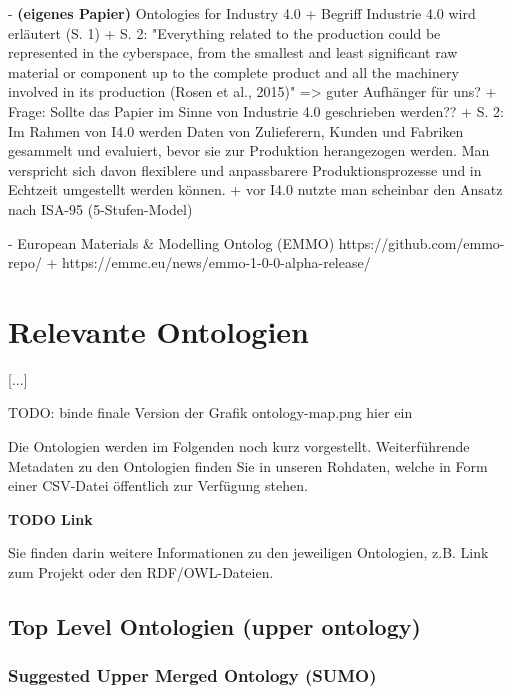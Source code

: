 \documentclass{article}
\begin{document}
- \textbf{(eigenes Papier)} Ontologies for Industry 4.0 \cite{kumar2019ontologies}
  + Begriff Industrie 4.0 wird erläutert (S. 1)
  + S. 2: "Everything related to the production could be represented in the cyberspace, from the smallest and least significant raw material or component up to the complete product and all the machinery
  involved in its production (Rosen et al., 2015)" => guter Aufhänger für uns?
  + Frage: Sollte das Papier im Sinne von Industrie 4.0 geschrieben werden??
  + S. 2: Im Rahmen von I4.0 werden Daten von Zulieferern, Kunden und Fabriken gesammelt und evaluiert, bevor sie zur Produktion herangezogen werden. Man verspricht sich davon flexiblere und anpassbarere Produktionsprozesse und in Echtzeit umgestellt werden können.
  + vor I4.0 nutzte man scheinbar den Ansatz nach ISA-95 (5-Stufen-Model)



- European Materials \& Modelling Ontolog (EMMO) https://github.com/emmo-repo/ + https://emmc.eu/news/emmo-1-0-0-alpha-release/

\section{Relevante Ontologien}

[...]

TODO: binde finale Version der Grafik ontology-map.png hier ein

Die Ontologien werden im Folgenden noch kurz vorgestellt.
Weiterführende Metadaten zu den Ontologien finden Sie in unseren Rohdaten, welche in Form einer CSV-Datei öffentlich zur Verfügung stehen.

\textbf{TODO Link}

Sie finden darin weitere Informationen zu den jeweiligen Ontologien, z.B. Link zum Projekt oder den RDF/OWL-Dateien.

\subsection{Top Level Ontologien (upper ontology)}

\subsubsection{Suggested Upper Merged Ontology (SUMO)}
\end{document}
